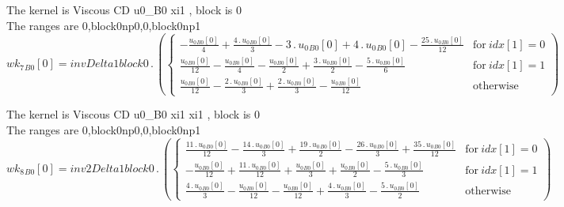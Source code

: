 \documentclass{article}
\begin{document}
\noindent The kernel is Viscous CD u0_B0 xi1 , block is 0\\\noindent The ranges are 0,block0np0,0,block0np1\\\begin{dmath}{wk_{7}{_{B0}}}[{0}] = invDelta1block0 \,.\, \left(\begin{cases} - \frac{{u_{0}{_{B0}}}[{0}]}{4} + \frac{4 \,.\, {u_{0}{_{B0}}}[{0}]}{3} - 3 \,.\, {u_{0}{_{B0}}}[{0}] + 4 \,.\, {u_{0}{_{B0}}}[{0}] - \frac{25 \,.\, 
{u_{0}{_{B0}}}[{0}]}{12} & \text{for}\: {idx}[{1}] = 0 \\\frac{{u_{0}{_{B0}}}[{0}]}{12} - \frac{{u_{0}{_{B0}}}[{0}]}{4} - \frac{{u_{0}{_{B0}}}[{0}]}{2} + \frac{3 \,.\, {u_{0}{_{B0}}}[{0}]}{2} - \frac{5 \,.\, {u_{0}{_{B0}}}[{0}]}{6} & \text{for}\: 
{idx}[{1}] = 1 \\\frac{{u_{0}{_{B0}}}[{0}]}{12} - \frac{2 \,.\, {u_{0}{_{B0}}}[{0}]}{3} + \frac{2 \,.\, {u_{0}{_{B0}}}[{0}]}{3} - \frac{{u_{0}{_{B0}}}[{0}]}{12} & \text{otherwise} \end{cases}\right)\end{dmath}

\noindent The kernel is Viscous CD u0_B0 xi1 xi1 , block is 0\\\noindent The ranges are 0,block0np0,0,block0np1\\\begin{dmath}{wk_{8}{_{B0}}}[{0}] = inv2Delta1block0 \,.\, \left(\begin{cases} \frac{11 \,.\, {u_{0}{_{B0}}}[{0}]}{12} - \frac{14 \,.\, {u_{0}{_{B0}}}[{0}]}{3} + \frac{19 \,.\, {u_{0}{_{B0}}}[{0}]}{2} - \frac{26 \,.\, {u_{0}{_{B0}}}[{0}]}{3} + 
\frac{35 \,.\, {u_{0}{_{B0}}}[{0}]}{12} & \text{for}\: {idx}[{1}] = 0 \\- \frac{{u_{0}{_{B0}}}[{0}]}{12} + \frac{11 \,.\, {u_{0}{_{B0}}}[{0}]}{12} + \frac{{u_{0}{_{B0}}}[{0}]}{3} + \frac{{u_{0}{_{B0}}}[{0}]}{2} - \frac{5 \,.\, {u_{0}{_{B0}}}[{0}]}{3} 
& \text{for}\: {idx}[{1}] = 1 \\\frac{4 \,.\, {u_{0}{_{B0}}}[{0}]}{3} - \frac{{u_{0}{_{B0}}}[{0}]}{12} - \frac{{u_{0}{_{B0}}}[{0}]}{12} + \frac{4 \,.\, {u_{0}{_{B0}}}[{0}]}{3} - \frac{5 \,.\, {u_{0}{_{B0}}}[{0}]}{2} & \text{otherwise} 
\end{cases}\right)\end{dmath}
\end{document}
